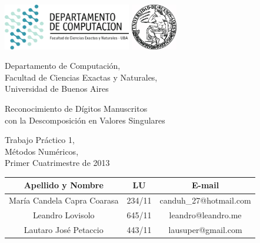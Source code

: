 \documentclass[a4paper,10pt,twoside]{article}
\begin{document}


\thispagestyle{caratula}

\begin{center}

\includegraphics[height=2cm]{DC.png} 
\hfill
\includegraphics[height=2cm]{UBA.jpg} 

\vspace{2cm}

Departamento de Computación,\\
Facultad de Ciencias Exactas y Naturales,\\
Universidad de Buenos Aires

\vspace{2cm}

\begin{spacing}{1}
\begin{Huge}

Reconocimiento de Dígitos Manuscritos\\
con la Descomposición en Valores Singulares

\end{Huge}
\end{spacing}

\vspace{2cm}

Trabajo Práctico 1, \\
Métodos Numéricos, \\
Primer Cuatrimestre de 2013

\vspace{3cm}

\begin{tabular}{|c|c|c|}
\hline
Apellido y Nombre & LU & E-mail\\
\hline
María Candela Capra Coarasa & 234/11 & canduh\_27@hotmail.com\\
Leandro Lovisolo            & 645/11 & leandro@leandro.me\\
Lautaro José Petaccio       & 443/11 & lausuper@gmail.com\\
\hline
\end{tabular}

\end{center}
\end{document}
